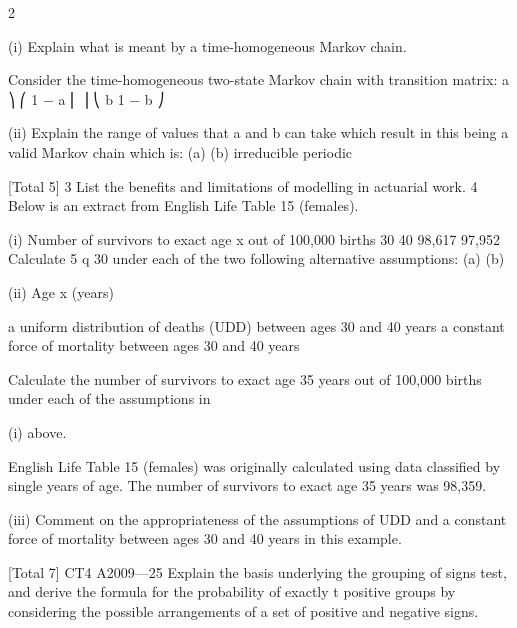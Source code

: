 2
\item (i)
Explain what is meant by a time-homogeneous Markov chain.

Consider the time-homogeneous two-state Markov chain with transition matrix:
a ⎞
⎛ 1 − a
⎜
⎟
⎝ b 1 − b ⎠
\item (ii)
Explain the range of values that a and b can take which result in this being a
valid Markov chain which is:
(a)
(b)
irreducible
periodic

[Total 5]
3 List the benefits and limitations of modelling in actuarial work.
4 Below is an extract from English Life Table 15 (females).
\item (i)
Number of survivors to
exact age x out of
100,000 births
30
40 98,617
97,952
Calculate 5 q 30 under each of the two following alternative assumptions:
(a)
(b)
\item (ii)
Age x
(years)

a uniform distribution of deaths (UDD) between ages 30 and 40 years
a constant force of mortality between ages 30 and 40 years

Calculate the number of survivors to exact age 35 years out of 100,000 births
under each of the assumptions in \item (i) above.

English Life Table 15 (females) was originally calculated using data classified by
single years of age. The number of survivors to exact age 35 years was 98,359.
\item (iii)
Comment on the appropriateness of the assumptions of UDD and a constant
force of mortality between ages 30 and 40 years in this example.

[Total 7]
CT4 A2009—25 Explain the basis underlying the grouping of signs test, and derive the formula for the
probability of exactly t positive groups by considering the possible arrangements of a
set of positive and negative signs.
